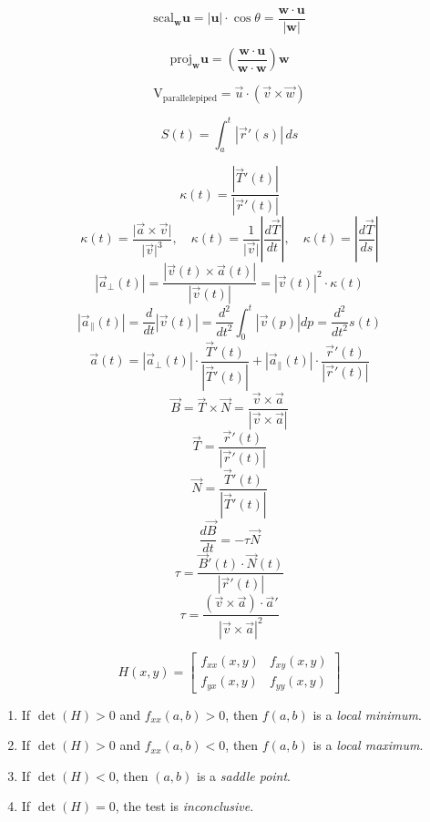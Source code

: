 \documentclass{report}
\begin{document}
\begin{multicols}{2}

	\[
		\text{scal}_{\mathbf{w}}\mathbf{u} = |\mathbf{u}| \cdot \cos\theta = \frac{\mathbf{w} \cdot \mathbf{u}}{|\mathbf{w}|}
	\]

	\[
		\text{proj}_{\mathbf{w}} \mathbf{u} = \left( \frac{\mathbf{w} \cdot \mathbf{u}}{\mathbf{w} \cdot \mathbf{w}} \right) \mathbf{w}
	\]

	\[
		\text{V}_{\text{parallelepiped}} = \vec{u} \cdot (\vec{v} \times \vec{w})
	\]

	\[
		S(t) = \int_a^t \left| \vec{r}'(s) \right| \, ds
	\]

	\[
		\kappa(t) = \frac{|\vec{T}'(t)|}{|\vec{r}'(t)|}
	\]
	\[
		\kappa(t) = \frac{\lvert \vec{a} \times \vec{v} \rvert}{\lvert \vec{v} \rvert^3}, \quad \kappa(t) = \frac{1}{\lvert \vec{v} \rvert} \left\lvert \frac{d\vec{T}}{dt} \right\rvert, \quad \kappa(t) = \left\lvert \frac{d\vec{T}}{ds} \right\rvert
	\]
	\[
		|\vec{a}_\perp(t)| = \frac{|\vec{v}(t) \times \vec{a}(t)|}{|\vec{v}(t)|} = |\vec{v}(t)|^2 \cdot \kappa(t)
	\]
	\[
		|\vec{a}_\parallel(t)| = \frac{d}{dt}|\vec{v}(t)| = \frac{d^2}{dt^2} \int_0^t |\vec{v}(p)| dp = \frac{d^2}{dt^2} s(t)
	\]
	\[
		\vec{a}(t) = |\vec{a}_\perp(t)| \cdot \frac{\vec{T}'(t)}{|\vec{T}'(t)|} + |\vec{a}_\parallel(t)| \cdot \frac{\vec{r}'(t)}{|\vec{r}'(t)|}
	\]
	\[
		\vec{B} = \vec{T} \times \vec{N} = \frac{\vec{v} \times \vec{a}}{|\vec{v} \times \vec{a}|}
	\]
	\[
		\vec{T} = \frac{\vec{r}'(t)}{|\vec{r}'(t)|}
	\]
	\[
		\vec{N} = \frac{\vec{T}'(t)}{|\vec{T}'(t)|}
	\]
	\[
		\frac{d\vec{B}}{dt} = -\tau \vec{N}
	\]
	\[
		\tau = \frac{\vec{B}'(t) \cdot \vec{N}(t)}{|\vec{r}'(t)|}
	\]
	\[
		\tau = \frac{(\vec{v} \times \vec{a}) \cdot \vec{a}'}{|\vec{v} \times \vec{a}|^2}
	\]

	\[
		H(x, y) = \begin{bmatrix}
			f_{xx}(x, y) & f_{xy}(x, y) \\
			f_{yx}(x, y) & f_{yy}(x, y)
		\end{bmatrix}
	\]

	\begin{enumerate}
		\item If \( \det(H) > 0 \) and \( f_{xx}(a, b) > 0 \), then \( f(a, b) \) is a \emph{local minimum}.
		\item If \( \det(H) > 0 \) and \( f_{xx}(a, b) < 0 \), then \( f(a, b) \) is a \emph{local maximum}.
		\item If \( \det(H) < 0 \), then \( (a, b) \) is a \emph{saddle point}.
		\item If \( \det(H) = 0 \), the test is \emph{inconclusive}.
	\end{enumerate}


\end{multicols}
\end{document}

